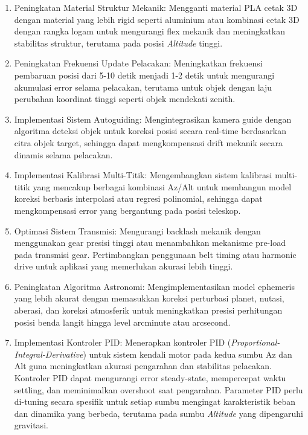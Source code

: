 \begin{enumerate}
    \item Peningkatan Material Struktur Mekanik: Mengganti material PLA cetak 3D dengan material yang lebih rigid seperti aluminium atau kombinasi cetak 3D dengan rangka logam untuk mengurangi flex mekanik dan meningkatkan stabilitas struktur, terutama pada posisi \textit{Altitude} tinggi.
    
    \item Peningkatan Frekuensi Update Pelacakan: Meningkatkan frekuensi pembaruan posisi dari 5-10 detik menjadi 1-2 detik untuk mengurangi akumulasi error selama pelacakan, terutama untuk objek dengan laju perubahan koordinat tinggi seperti objek mendekati zenith.
    
    \item Implementasi Sistem Autoguiding: Mengintegrasikan kamera guide dengan algoritma deteksi objek untuk koreksi posisi secara real-time berdasarkan citra objek target, sehingga dapat mengkompensasi drift mekanik secara dinamis selama pelacakan.
    
    \item Implementasi Kalibrasi Multi-Titik: Mengembangkan sistem kalibrasi multi-titik yang mencakup berbagai kombinasi Az/Alt untuk membangun model koreksi berbasis interpolasi atau regresi polinomial, sehingga dapat mengkompensasi error yang bergantung pada posisi teleskop.
    
    \item Optimasi Sistem Transmisi: Mengurangi backlash mekanik dengan menggunakan gear presisi tinggi atau menambahkan mekanisme pre-load pada transmisi gear. Pertimbangkan penggunaan belt timing atau harmonic drive untuk aplikasi yang memerlukan akurasi lebih tinggi.
    
    \item Peningkatan Algoritma Astronomi: Mengimplementasikan model ephemeris yang lebih akurat dengan memasukkan koreksi perturbasi planet, nutasi, aberasi, dan koreksi atmosferik untuk meningkatkan presisi perhitungan posisi benda langit hingga level arcminute atau arcsecond.
    
    \item Implementasi Kontroler PID: Menerapkan kontroler PID (\textit{Proportional-Integral-Derivative}) untuk sistem kendali motor pada kedua sumbu Az dan Alt guna meningkatkan akurasi pengarahan dan stabilitas pelacakan. Kontroler PID dapat mengurangi error steady-state, mempercepat waktu settling, dan meminimalkan overshoot saat pengarahan. Parameter PID perlu di-tuning secara spesifik untuk setiap sumbu mengingat karakteristik beban dan dinamika yang berbeda, terutama pada sumbu \textit{Altitude} yang dipengaruhi gravitasi.
    
\end{enumerate}